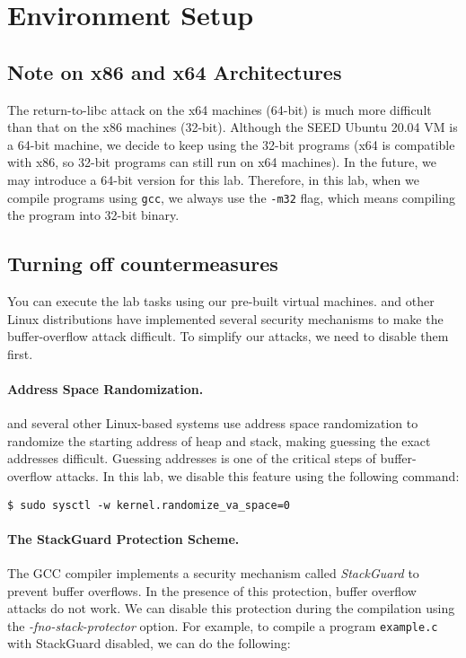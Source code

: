 \section{Environment Setup}


\subsection{Note on x86 and x64 Architectures}


The return-to-libc attack on the x64 machines (64-bit)
is much more difficult than that on the x86 machines (32-bit).
Although the SEED Ubuntu 20.04 VM is a 64-bit machine,
we decide to keep using the 32-bit programs (x64 is
compatible with x86, so 32-bit programs can still 
run on x64 machines). In the future, we may 
introduce a 64-bit version for this lab. 
Therefore, in this lab, when we compile 
programs using \texttt{gcc}, we always 
use the \texttt{-m32} flag, which means compiling 
the program into 32-bit binary. 


\subsection{Turning off countermeasures}

You can execute the lab tasks using our pre-built \ubuntu virtual machines.
\ubuntu and other Linux distributions have implemented several
security mechanisms to make the buffer-overflow attack difficult.
To simplify our attacks, we need to disable them first.


\paragraph{Address Space Randomization.}
\ubuntu and several other Linux-based systems use address space
randomization to randomize the starting address of heap and
stack, making guessing the exact addresses difficult. Guessing
addresses is one of the critical steps of buffer-overflow attacks.  In
this lab, we disable this feature using the following command:

\begin{lstlisting}
$ sudo sysctl -w kernel.randomize_va_space=0
\end{lstlisting}


\paragraph{The StackGuard Protection Scheme.}
The GCC compiler implements a security mechanism called
\textit{StackGuard} to prevent buffer overflows. In the presence of this
protection, buffer overflow attacks do not work. We can disable this
protection during the compilation using the
\emph{-fno-stack-protector} option. For example, to compile a program
\texttt{example.c} with StackGuard disabled, we can do the following:


